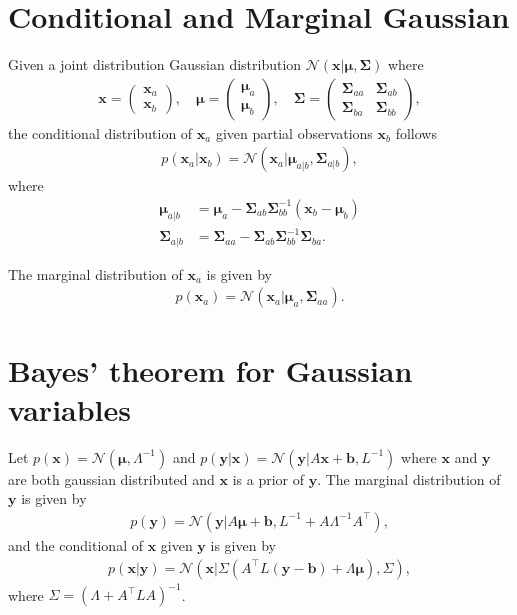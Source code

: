 \documentclass{article} %
\theoremstyle{definition}
\newcommand\mb{\mathbf}
\newcommand\mc{\mathcal}
\newcommand\bs{\boldsymbol}
\begin{document}
\section{Conditional and Marginal Gaussian}
Given a joint distribution Gaussian distribution $\mc{N}(\mb{x}|\bs{\mu}, \bs{\Sigma})$ where
\begin{align}
\mb{x} =
 \begin{pmatrix}
  \mb{x}_{a} \\
  \mb{x}_{b}
 \end{pmatrix},
\quad
\bs{\mu} = 
 \begin{pmatrix} 
  \bs{\mu}_{a} \\
  \bs{\mu}_{b}
 \end{pmatrix},
\quad
\bs{\Sigma} = 
 \begin{pmatrix}
  \bs{\Sigma}_{aa} & \bs{\Sigma}_{ab} \\
  \bs{\Sigma}_{ba} & \bs{\Sigma}_{bb}
 \end{pmatrix},
\end{align}
the conditional distribution of $\mb{x}_a$ given partial observations $\mb{x}_b$ follows
\begin{align}
p(\mb{x}_a|\mb{x}_b) = \mc{N}(\mb{x}_a|\bs{\mu}_{a|b}, \bs{\Sigma}_{a|b}),
\end{align}
where
\begin{align}
\bs{\mu}_{a|b} &= \bs\mu_{a} - \bs\Sigma_{ab}\bs\Sigma_{bb}^{-1}(\mb{x}_b - \bs{\mu}_b) \\
\bs{\Sigma}_{a|b} &= \bs\Sigma_{aa} - \bs\Sigma_{ab}\bs\Sigma_{bb}^{-1}\bs\Sigma_{ba}.
\end{align}

The marginal distribution of $\mb{x}_a$ is given by
\begin{align}
p(\mb{x}_a) = \mathcal{N}(\mb{x}_a|\bs\mu_a,\bs\Sigma_{aa}).
\end{align}

\section{Bayes' theorem for Gaussian variables}
Let $p(\mb{x}) = \mc{N}(\bs\mu, \Lambda^{-1})$ and $p(\mb{y}|\mb{x}) = \mc{N}(\mb{y}|A\mb{x} + \mb{b}, L^{-1})$ where $\mb{x}$ and $\mb{y}$ are both gaussian distributed and $\mb{x}$ is a prior of $\mb{y}$. The marginal distribution of $\mb{y}$ is given by
\begin{align}
p(\mb{y}) = \mc{N}(\mb{y}|A\bs\mu + \mb b, L^{-1} + A\Lambda^{-1}A^\top),
\end{align}
and the conditional of $\mb{x}$ given $\mb{y}$ is given by
\begin{align}
p(\mb{x}|\mb{y}) = \mc{N}(\mb{x}|\Sigma(A^\top L(\mb y - \mb b) + \Lambda \bs\mu), \Sigma),
\end{align}
where $\Sigma = (\Lambda + A^\top L A)^{-1}$.



\end{document}
